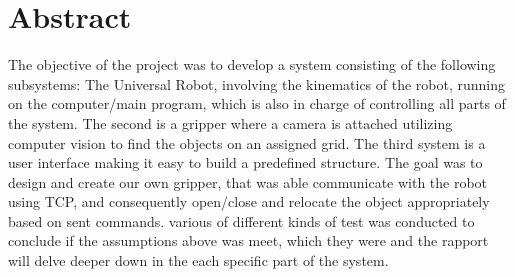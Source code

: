 \section{Abstract}
The objective of the project was to develop a system consisting of the following subsystems: The Universal Robot, involving the kinematics of the robot, running on the computer/main program, which is also in charge of controlling all parts of the system. The second is a gripper where a camera is attached utilizing computer vision to find the objects on an assigned grid. The third system is a user interface making it easy to build a predefined structure. The goal was to design and create our own gripper, that was able communicate with the robot using TCP, and consequently open/close and relocate the object appropriately based on sent commands. various of different kinds of test was conducted to conclude if the assumptions above was meet, which they were and the rapport will delve deeper down in the each specific part of the system.
